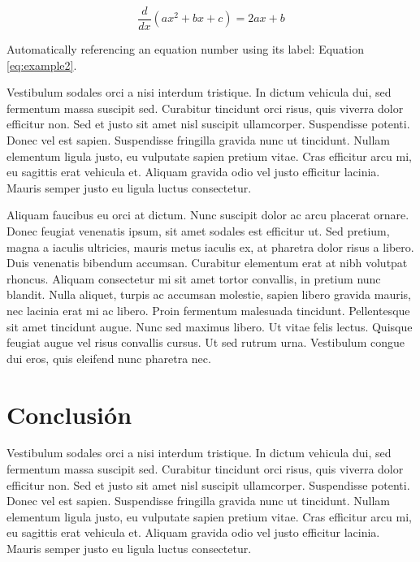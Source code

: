 \documentclass[
    a4paper, %
    10pt, %
    unnumbered sections, %
    two side, %
]{LTJournalArticle}
\begin{document}
\begin{equation}
    \frac{d}{dx}\left( a x^2 + b x + c \right) = 2ax + b
    \label{eq:example2}
\end{equation}

Automatically referencing an equation number using its label: Equation \ref{eq:example2}.

Vestibulum sodales orci a nisi interdum tristique. In dictum vehicula dui, sed fermentum massa suscipit sed. Curabitur tincidunt orci risus, quis viverra dolor efficitur non. Sed et justo sit amet nisl suscipit ullamcorper. Suspendisse potenti. Donec vel est sapien. Suspendisse fringilla gravida nunc ut tincidunt. Nullam elementum ligula justo, eu vulputate sapien pretium vitae. Cras efficitur arcu mi, eu sagittis erat vehicula et. Aliquam gravida odio vel justo efficitur lacinia. Mauris semper justo eu ligula luctus consectetur.

Aliquam faucibus eu orci at dictum. Nunc suscipit dolor ac arcu placerat ornare. Donec feugiat venenatis ipsum, sit amet sodales est efficitur ut. Sed pretium, magna a iaculis ultricies, mauris metus iaculis ex, at pharetra dolor risus a libero. Duis venenatis bibendum accumsan. Curabitur elementum erat at nibh volutpat rhoncus. Aliquam consectetur mi sit amet tortor convallis, in pretium nunc blandit. Nulla aliquet, turpis ac accumsan molestie, sapien libero gravida mauris, nec lacinia erat mi ac libero. Proin fermentum malesuada tincidunt. Pellentesque sit amet tincidunt augue. Nunc sed maximus libero. Ut vitae felis lectus. Quisque feugiat augue vel risus convallis cursus. Ut sed rutrum urna. Vestibulum congue dui eros, quis eleifend nunc pharetra nec.



\section{Conclusión}

Vestibulum sodales orci a nisi interdum tristique. In dictum vehicula dui, sed fermentum massa suscipit sed. Curabitur tincidunt orci risus, quis viverra dolor efficitur non. Sed et justo sit amet nisl suscipit ullamcorper. Suspendisse potenti. Donec vel est sapien. Suspendisse fringilla gravida nunc ut tincidunt. Nullam elementum ligula justo, eu vulputate sapien pretium vitae. Cras efficitur arcu mi, eu sagittis erat vehicula et. Aliquam gravida odio vel justo efficitur lacinia. Mauris semper justo eu ligula luctus consectetur.
\end{document}
